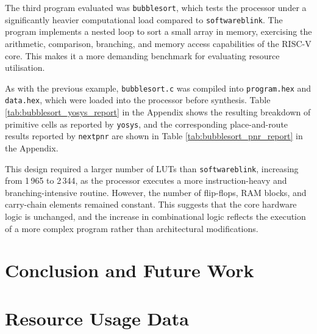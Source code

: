 \documentclass[a4paper,10pt]{article}
\begin{document}
The third program evaluated was \texttt{bubblesort}, 
which tests the processor under a significantly 
heavier computational load compared to \texttt{softwareblink}. 
The program implements a nested loop to sort a small array in memory, 
exercising the arithmetic, comparison, branching, 
and memory access capabilities of the RISC-V core. 
This makes it a more demanding benchmark for 
evaluating resource utilisation.

As with the previous example, 
\texttt{bubblesort.c} was compiled into 
\texttt{program.hex} and \texttt{data.hex}, 
which were loaded into the processor before synthesis. 
Table \ref{tab:bubblesort_yosys_report} in the Appendix
shows the resulting breakdown of 
primitive cells as reported by \texttt{yosys},
and the corresponding place-and-route results reported by 
\texttt{nextpnr} are shown in 
Table \ref{tab:bubblesort_pnr_report} in the Appendix.

This design required a larger number of LUTs than 
\texttt{softwareblink}, increasing from 1\,965 to 2\,344, 
as the processor executes a more instruction-heavy and 
branching-intensive routine. 
However, the number of flip-flops, RAM blocks, 
and carry-chain elements remained constant. 
This suggests that the core hardware logic is unchanged, 
and the increase in combinational logic reflects 
the execution of a more complex program 
rather than architectural modifications.

\section{Conclusion and Future Work}
\label{sec:Conclusion_and_Future_Work}

\newpage
\appendix
\label{Appendix}
\section{Resource Usage Data}
\end{document}
